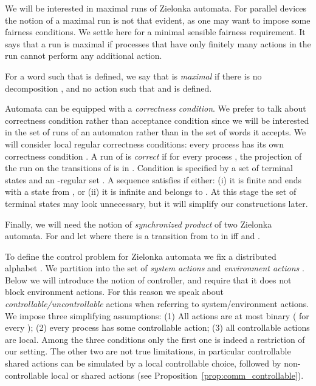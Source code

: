 \documentclass[10pt,a4paper]{article}
\begin{document}
We will be interested in maximal runs of Zielonka
automata. For parallel devices the notion of a maximal run is not that
evident, as one may want to impose some fairness conditions. We settle here
for a minimal sensible fairness requirement. It says that a run is
maximal if processes that have only finitely many actions in the run
cannot perform any additional action.

\begin{definition}
For a word  such that  is
defined, we say that  is
\emph{maximal} if there is no 
decomposition , and no action
 such that  and  is defined. 
\end{definition}




Automata can be equipped with a \emph{correctness condition}. We prefer
to talk about correctness condition rather than acceptance condition
since we will be interested in the set of runs of an automaton rather
than in the set of words it accepts. We will consider local
regular correctness conditions: every process has its own correctness
condition . A run of  is
\emph{correct} if for every process , the projection of the run on
the transitions of  is in . Condition
 is 
specified by a set  of terminal states and an
-regular set . A sequence  satisfies
 if either: (i) 
it is finite and ends with a state from , or (ii)
it is infinite and belongs to .
At this stage the set of terminal states  may look unnecessary, but
it will simplify our constructions later. 

Finally, we will need the notion of \emph{synchronized product}
 of two Zielonka automata. For
 and
 let
 where there is
a transition from  to
 in  iff  and .

\medskip


To define the control problem for Zielonka automata we fix a
distributed alphabet . We partition  into the set of \emph{system actions}  and
\emph{environment actions} . Below we will introduce the notion of
controller, and require that it does not block environment
actions. For this reason we speak about
\emph{controllable/uncontrollable} actions when referring to system/environment
actions. We impose three simplifying assumptions: (1) All actions are
at most binary ( for every ); (2) every
process has some controllable action; (3) 
all controllable actions are local. 
Among the three conditions only the first one is indeed a restriction of
our setting. The other two are not true limitations, in particular controllable
shared actions can be simulated by a local controllable choice, followed by 
non-controllable local or shared actions (see
Proposition~\ref{prop:comm_controllable}).
\end{document}
